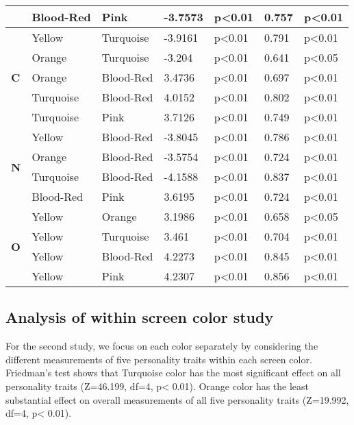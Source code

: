 \begin{longtable}{ |p{0.5cm}| p{1.9cm}|p{1.9cm}|p{1.2cm}| p{1.7cm}|p{1cm}|p{1.5cm}|  }
&Blood-Red	&Pink				&-3.7573			&p<0.01			& 0.757		&p<0.01\\
\hline 
\hline 
\multirow{5}{*}{\textbf{C}} 
&Yellow		&Turquoise			&-3.9161			&p<0.01			&0.791 		&p<0.01\\
&Orange		&Turquoise			&-3.204			&p<0.01			& 0.641		&p<0.05\\
&Orange		&Blood-Red			&3.4736			&p<0.01			&0.697 		&p<0.01\\
&Turquoise	&Blood-Red			&4.0152			&p<0.01			& 0.802		&p<0.01\\
&Turquoise	&Pink				&3.7126			&p<0.01			& 0.749		&p<0.01\\
\hline 
\hline 
\multirow{4}{*}{\textbf{N}} 
&Yellow		&Blood-Red			&-3.8045			&p<0.01			&0.786 		&p<0.01\\
&Orange		&Blood-Red			&-3.5754			&p<0.01			&0.724 		&p<0.01\\
&Turquoise		&Blood-Red		&-4.1588			&p<0.01			&0.837 		&p<0.01\\
&Blood-Red		&Pink			&3.6195			&p<0.01			&0.724 		&p<0.01\\

\hline 
\hline 
\multirow{4}{*}{\textbf{O}} 
&Yellow		&Orange			&3.1986			&p<0.01			&0.658 		&p<0.05\\
&Yellow		&Turquoise			&3.461		&p<0.01			&0.704 		&p<0.01\\
&Yellow		&Blood-Red			&4.2273		&p<0.01			&0.845 		&p<0.01\\
&Yellow		&Pink			&4.2307			&p<0.01			&0.856 		&p<0.01\\
\hline 
\end{longtable}

\subsection{Analysis of within screen color study}
\label{Study2(M-T)}
For the second study, we focus on each color separately by considering the different measurements of five personality traits within each screen color. Friedman’s test shows that Turquoise color has the most significant effect on all personality traits (Z=46.199, df=4, p< 0.01). Orange color has the least substantial effect on overall measurements of all five personality traits (Z=19.992, df=4, p< 0.01).

